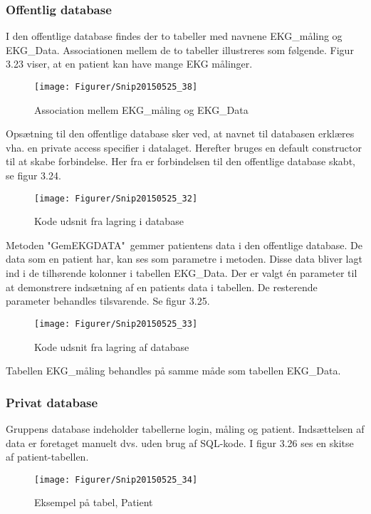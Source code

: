 \subsubsection{Offentlig database}
I den offentlige database findes der to tabeller med navnene EKG\_måling og EKG\_Data. Associationen mellem de to tabeller illustreres som følgende. Figur 3.23 viser, at en patient kan have mange EKG målinger. 

\begin{figure}[H]
	\centering
	\texttt{[image: Figurer/Snip20150525\_38]}
	\caption{Association mellem EKG\_måling og EKG\_Data}
\end{figure}

Opsætning til den offentlige database sker ved, at navnet til databasen erklæres vha. en private access specifier i datalaget. Herefter bruges en default constructor til at skabe forbindelse. Her fra er forbindelsen til den offentlige database skabt, se figur 3.24.

\begin{figure}[H]
	\centering
	\texttt{[image: Figurer/Snip20150525\_32]}	
	\caption{Kode udsnit fra lagring i database}
\end{figure}

Metoden "GemEKGDATA"\  gemmer patientens data i den offentlige database. De data som en patient har, kan ses som parametre i metoden. Disse data bliver lagt ind i de tilhørende kolonner i tabellen EKG\_Data. Der er valgt én parameter til at demonstrere indsætning af en patients data i tabellen. De resterende parameter behandles tilsvarende. Se figur 3.25. 

\begin{figure}[H]
	\centering
	\texttt{[image: Figurer/Snip20150525\_33]}
	\caption{Kode udsnit fra lagring af database}
\end{figure}

Tabellen EKG\_måling behandles på samme måde som tabellen EKG\_Data. 

\subsubsection{Privat database}
Gruppens database indeholder tabellerne login, måling og patient. Indsættelsen af data er foretaget manuelt dvs. uden brug af SQL-kode. I figur 3.26 ses en skitse af patient-tabellen. 

\begin{figure}[H]
	\centering
	\texttt{[image: Figurer/Snip20150525\_34]}
	\caption{Eksempel på tabel, Patient}
\end{figure}

